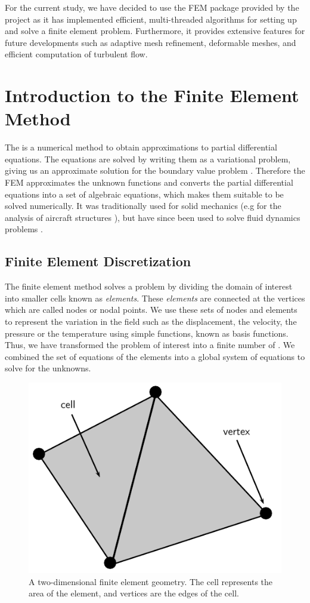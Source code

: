 For the current study, we have decided to use the FEM package provided by the \fenics project as it has implemented efficient, multi-threaded algorithms for setting up and solve a finite element problem. Furthermore, it provides extensive features for future developments such as adaptive mesh refinement, deformable meshes, and efficient computation of turbulent flow.

\section{Introduction to the Finite Element Method}
\label{sec:e-ithfem}
The  is a numerical method to obtain approximations to partial differential equations. The equations are solved by writing them as a variational problem, giving us an approximate solution for the boundary value problem \cite{Brenner2002}. Therefore the FEM approximates the unknown functions and converts the partial differential equations into a set of algebraic equations, which makes them suitable to be solved numerically. It was traditionally used for solid mechanics (e.g for the analysis of aircraft structures \cite{RAO2011}), but have since been used to solve fluid dynamics problems \cite{Guermond2006a,Johnston2004a,Guermond2003a}.


\subsection{Finite Element Discretization}

The finite element method solves a problem by dividing the domain of interest into smaller cells known as \textit{elements}. These \textit{elements} are connected at the vertices which are called nodes or nodal points. We use these sets of nodes and elements to represent the variation in the field such as the displacement, the velocity, the pressure or the temperature using simple functions, known as basis functions. Thus, we have transformed the problem of interest into a finite number of . We combined the set of equations of the elements into a global system of equations to solve for the unknowns.

	\begin{figure}[!h]
	\centering
	\includegraphics[width=0.4\linewidth]{./figures/eulerian/finiteElementDefinitions.pdf}
	\caption{A two-dimensional finite element geometry. The cell represents the area of the element, and vertices are the edges of the cell.}
	\label{fig:finiteElementDefinitions}
	\end{figure}

